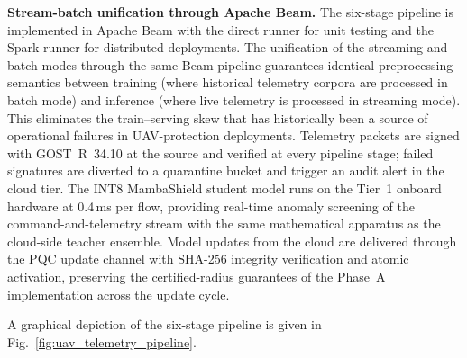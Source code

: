 \noindent\textbf{Stream-batch unification through Apache Beam.}
The six-stage pipeline is implemented in Apache Beam with the
direct runner for unit testing and the Spark runner for
distributed deployments. The unification of the streaming and
batch modes through the same Beam pipeline guarantees identical
preprocessing semantics between training (where historical
telemetry corpora are processed in batch mode) and inference
(where live telemetry is processed in streaming mode). This
eliminates the train--serving skew that has historically been a
source of operational failures in UAV-protection deployments.
Telemetry packets are signed with GOST~R~34.10 at the source and
verified at every pipeline stage; failed signatures are diverted
to a quarantine bucket and trigger an audit alert in the cloud
tier. The INT8 MambaShield student model runs on the Tier~1
onboard hardware at 0.4\,ms per flow, providing real-time anomaly
screening of the command-and-telemetry stream with the same
mathematical apparatus as the cloud-side teacher ensemble. Model
updates from the cloud are delivered through the PQC update
channel with SHA-256 integrity verification and atomic activation,
preserving the certified-radius guarantees of the Phase~A
implementation across the update cycle.

A graphical depiction of the six-stage pipeline is given in
Fig.~\ref{fig:uav_telemetry_pipeline}.

